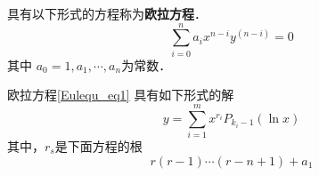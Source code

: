 
\begin{issues}
\issueDraft
\end{issues}

具有以下形式的方程称为\textbf{欧拉方程}．
\begin{equation}\label{Eulequ_eq1}
\sum_{i=0}^{n}a_ix^{n-i}y^{(n-i)}=0
\end{equation}
其中 $a_0=1,a_1,\cdots,a_n$为常数．

欧拉方程\autoref{Eulequ_eq1} 具有如下形式的解
\begin{equation}
y=\sum_{i=1}^mx^{r_i}P_{k_i-1}(\ln x)
\end{equation}
其中，$r_s$是下面方程的根
\begin{equation}
r(r-1)\cdots(r-n+1)+a_1
\end{equation}
